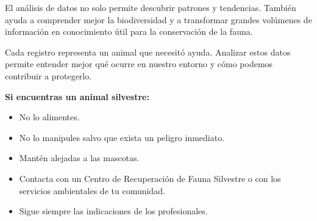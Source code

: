 \documentclass[11pt,a4paper]{article}
\begin{document}
\vspace{0.30cm}


\begin{tcolorbox}[
colback=Stone,
colframe=SoftGreen,
title=\faLeaf\ Reflexión,
fonttitle=\bfseries,
top=3mm,
bottom=3mm,
left=2mm,
right=2mm]

El análisis de datos no solo permite descubrir patrones y tendencias. También ayuda a comprender mejor la biodiversidad y a transformar grandes volúmenes de información en conocimiento útil para la conservación de la fauna.

Cada registro representa un animal que necesitó ayuda. Analizar estos datos permite entender mejor qué ocurre en nuestro entorno y cómo podemos contribuir a protegerlo.

\end{tcolorbox}

\vspace{0.30cm}


\begin{tcolorbox}[
colback=Stone,
colframe=SoftGreen,
title=\faPhone\ ¿Encuentras un animal silvestre?,
fonttitle=\bfseries,
top=3mm,
bottom=3mm,
left=2mm,
right=2mm]

\textbf{Si encuentras un animal silvestre:}

\vspace{0.15cm}

\begin{itemize}
\setlength{\itemsep}{5pt}

\item No lo alimentes.

\item No lo manipules salvo que exista un peligro inmediato.

\item Mantén alejadas a las mascotas.

\item Contacta con un Centro de Recuperación de Fauna Silvestre o con los servicios ambientales de tu comunidad.

\item Sigue siempre las indicaciones de los profesionales.

\end{itemize}

\end{tcolorbox}
\end{document}
